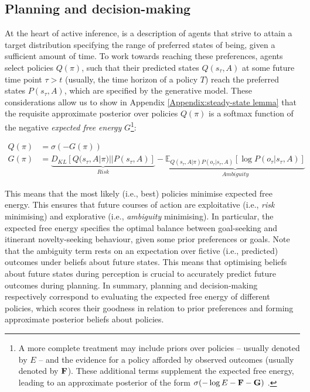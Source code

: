 \documentclass[review,12pt,authoryear]{elsarticle}
\begin{document}
\subsection{Planning and decision-making}

At the heart of active inference, is a description of agents that strive to attain a target distribution specifying the range of preferred states of being, given a sufficient amount of time. To work towards reaching these preferences, agents select policies $Q(\pi)$, such that their predicted states $Q(s_\tau,A)$ at some future time point $\tau > t$ (usually, the time horizon of a policy $T$) reach the preferred states $P(s_\tau,A)$, which are specified by the generative model. These considerations allow us to show in Appendix \ref{Appendix:steady-state lemma} that the requisite approximate posterior over policies $Q(\pi)$ is a softmax function of the negative \textit{expected free energy} $G$\footnote{A more complete treatment may include priors over policies – usually denoted by $E$ – and the evidence for a policy afforded by observed outcomes (usually denoted by $\bold F$). These additional terms supplement the expected free energy, leading to an approximate posterior of the form $\sigma (- \log E - \bold F - \bold G)$ \citep{fristonDeepTemporalModels2018}.}:

\begin{equation}
\label{eq: approx post policies}
\begin{split}
   Q(\pi) &=\sigma(-G(\pi)) \\
   G(\pi) &= \underbrace{ D_{KL}[Q(s_\tau, A|\pi)||P(s_\tau, A)]}_{Risk}- \underbrace{\mathbb E_{Q(s_\tau, A|\pi)P(o_\tau|s_\tau, A)}[ \log P(o_\tau |s_\tau, A)]}_{Ambiguity}
\end{split}
\end{equation}

This means that the most likely (i.e., best) policies minimise expected free energy. This ensures that future courses of action are exploitative (i.e., \textit{risk} minimising) and explorative (i.e., \textit{ambiguity} minimising). In particular, the expected free energy specifies the optimal balance between goal-seeking and itinerant novelty-seeking behaviour, given some prior preferences or goals. Note that the ambiguity term rests on an expectation over fictive (i.e., predicted) outcomes under beliefs about future states. This means that optimising beliefs about future states during perception is crucial to accurately predict future outcomes during planning. In summary, planning and decision-making respectively correspond to evaluating the expected free energy of different policies, which scores their goodness in relation to prior preferences and forming approximate posterior beliefs about policies.
\end{document}
